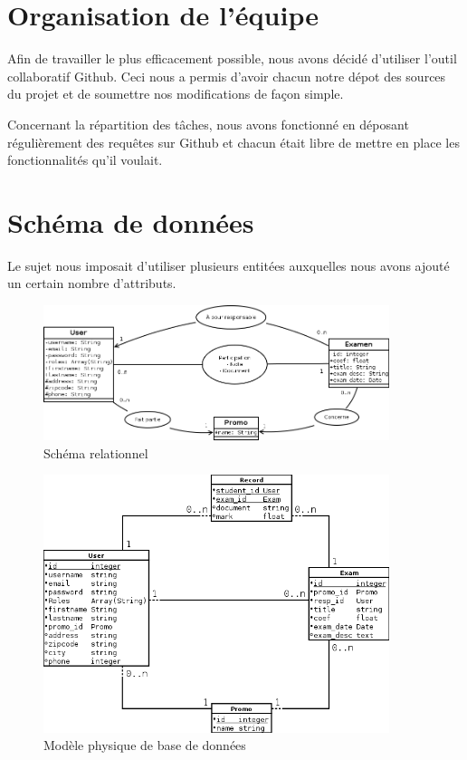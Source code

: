 \documentclass{report}
\begin{document}
  \section{Organisation de l'équipe}
  	Afin de travailler le plus efficacement possible, nous avons décidé d'utiliser l'outil collaboratif Github. Ceci nous a permis d'avoir chacun notre dépot des sources du projet et de soumettre nos modifications de façon simple.
  	
  	Concernant la répartition des tâches, nous avons fonctionné en déposant régulièrement des requêtes sur Github et chacun était libre de mettre en place les fonctionnalités qu'il voulait.
  	
  \section{Schéma de données}
    Le sujet nous imposait d'utiliser plusieurs entitées auxquelles nous avons 
    ajouté un certain nombre d'attributs.

    \begin{figure}
      \caption{Schéma relationnel}
      \includegraphics[width=0.9\textwidth]{./data.png}
    \end{figure}

    \begin{figure}
      \caption{Modèle physique de base de données}
      \includegraphics[width=0.9\textwidth]{./db.png}
    \end{figure}
\end{document}
